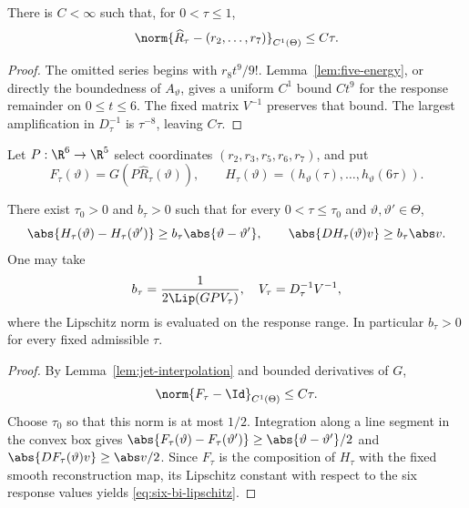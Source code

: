 \begin{lemma}
\label{lem:jet-interpolation}
There is \(C<\infty\) such that, for \(0<\tau\le1\),
\[
 \norm{\widehat R_\tau-(r_2,\ldots,r_7)}_{C^1(\Theta)}\le C\tau.
\]
\end{lemma}

\begin{proof}
The omitted series begins with \(r_8t^9/9!\).  Lemma~\ref{lem:five-energy},
or directly the boundedness of \(A_\vartheta\), gives a uniform \(C^1\)
bound \(C t^9\) for the response remainder on \(0\le t\le6\).  The fixed
matrix \(V^{-1}\) preserves that bound.  The largest amplification in
\(D_\tau^{-1}\) is \(\tau^{-8}\), leaving \(C\tau\).
\end{proof}

Let \(P:\R^6\to\R^5\) select coordinates \((r_2,r_3,r_5,r_6,r_7)\), and
put
\begin{equation}
 F_\tau(\vartheta)=G(P\widehat R_\tau(\vartheta)),\qquad
 H_\tau(\vartheta)=(h_\vartheta(\tau),\ldots,h_\vartheta(6\tau)).
 \label{eq:six-response-map}
\end{equation}

\begin{theorem}
\label{thm:jet-embedding}
There exist \(\tau_0>0\) and \(b_\tau>0\) such that for every
\(0<\tau\le\tau_0\) and \(\vartheta,\vartheta'\in\Theta\),
\begin{equation}
 \abs{H_\tau(\vartheta)-H_\tau(\vartheta')}
 \ge b_\tau\abs{\vartheta-\vartheta'},
 \qquad
 \abs{DH_\tau(\vartheta)v}\ge b_\tau\abs v.
 \label{eq:six-bi-lipschitz}
\end{equation}
One may take
\[
 b_\tau=\frac1{2\Lip(GPV_\tau)},
 \quad
 V_\tau=D_\tau^{-1}V^{-1},
\]
where the Lipschitz norm is evaluated on the response range.  In particular
\(b_\tau>0\) for every fixed admissible \(\tau\).
\end{theorem}

\begin{proof}
By Lemma~\ref{lem:jet-interpolation} and bounded derivatives of \(G\),
\[
 \norm{F_\tau-\Id}_{C^1(\Theta)}\le C\tau.
\]
Choose \(\tau_0\) so that this norm is at most \(1/2\).  Integration along a
line segment in the convex box gives
\(\abs{F_\tau(\vartheta)-F_\tau(\vartheta')}\ge
\abs{\vartheta-\vartheta'}/2\) and
\(\abs{DF_\tau(\vartheta)v}\ge\abs v/2\).  Since \(F_\tau\) is the
composition of \(H_\tau\) with the fixed smooth reconstruction map, its
Lipschitz constant with respect to the six response values yields
\eqref{eq:six-bi-lipschitz}.
\end{proof}

